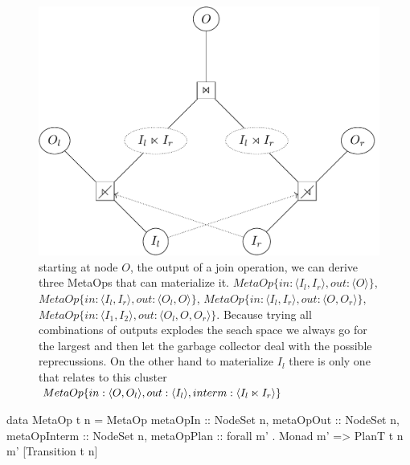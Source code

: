 \begin{figure}[p]
\centering
\includegraphics[width=.9\linewidth]{./imgs/example_metaop.pdf}
\caption{\label{fig:example_metaop}starting at node \(O\), the output
  of a join operation, we can derive three MetaOps that can
  materialize it.
  \(MetaOp\{in: \langle I_l, I_r \rangle, out: \langle O \rangle \}\),
  \(MetaOp\{in: \langle I_l, I_r \rangle, out: \langle O_l, O \rangle
  \}\),
  \(MetaOp\{in: \langle I_l, I_r \rangle, out: \langle O, O_r \rangle
  \}\),
  \(MetaOp\{in: \langle I_1, I_2 \rangle, out: \langle O_l, O, O_r
  \rangle \}\). Because trying all combinations of outputs explodes
  the seach space we always go for the largest and then let the
  garbage collector deal with the possible reprecussions. On the other
  hand to materialize \(I_l\) there is only one  that
  relates to this cluster
  \(MetaOp\{in:\langle O, O_l \rangle, out: \langle I_l \rangle,
  interm: \langle I_l \ltimes I_r \rangle \}\)}
\end{figure}

\begin{code}
\begin{haskellcode}
data MetaOp t n = MetaOp {
  metaOpIn     :: NodeSet n,
  metaOpOut    :: NodeSet n,
  metaOpInterm :: NodeSet n,
  metaOpPlan   :: forall m' . Monad m' => PlanT t n m' [Transition t n]
  }
\end{haskellcode}
  \caption{\label{lst:metaop_def}A  refers to input,
    output, and intermediate nodes that are involved in the set of
    operations it abstracts. Furthermore it contains a computation
    that registers and returns the transitions involved in the
    .}
\end{code}


